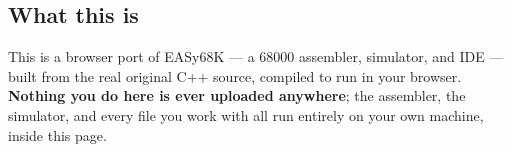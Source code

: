\subsection*{What this is}
This is a browser port of EASy68K — a 68000 assembler, simulator, and IDE — built from the real original C++ source, compiled to run in your browser. \textbf{Nothing you do here is ever uploaded anywhere}; the assembler, the simulator, and every file you work with all run entirely on your own machine, inside this page.
